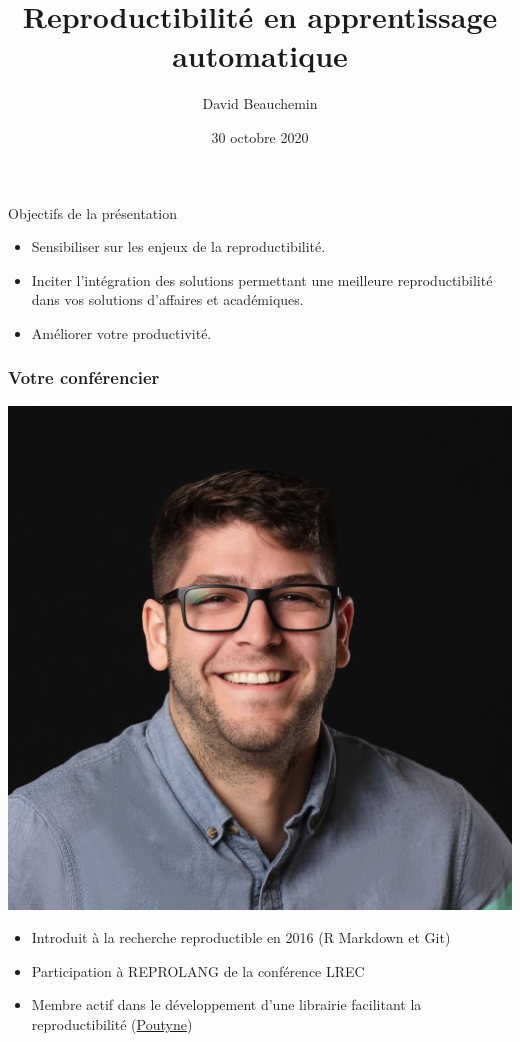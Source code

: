 \documentclass[aspectratio=169,10pt,xcolor=x11names,english,french]{beamer}
\title{Reproductibilité en apprentissage automatique}
\author{David Beauchemin}
\date{30 octobre 2020}
\begin{document}
	
	
	
	
	\begin{frame}{Objectifs de la présentation}
		\begin{itemize}
			\item Sensibiliser sur les enjeux de la reproductibilité.
			\item Inciter l'intégration des solutions permettant une meilleure reproductibilité dans vos solutions d'affaires et académiques.
			\item Améliorer votre productivité.
		\end{itemize}
	\end{frame}
	
	\begin{frame}
		\frametitle{Votre conférencier}
		
		\begin{minipage}{0.25\linewidth}
			\includegraphics[width=\linewidth,keepaspectratio]{img/david}
		\end{minipage}
		\hfill
		\begin{minipage}{0.70\linewidth}
			\begin{itemize}
				\item Introduit à la recherche reproductible en 2016 (R Markdown et Git)
				\item Participation à REPROLANG de la conférence LREC \cite{garneau2020robust}
				\item Membre actif dans le développement d'une librairie facilitant la reproductibilité (\href{https://poutyne.org/}{Poutyne})
			\end{itemize}
		\end{minipage}
		

\end{frame}
\end{document}
